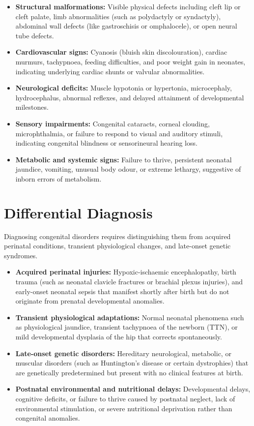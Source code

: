 \begin{itemize}
    \item \textbf{Structural malformations:} Visible physical defects including cleft lip or cleft palate, limb abnormalities (such as polydactyly or syndactyly), abdominal wall defects (like gastroschisis or omphalocele), or open neural tube defects.
    \item \textbf{Cardiovascular signs:} Cyanosis (bluish skin discolouration), cardiac murmurs, tachypnoea, feeding difficulties, and poor weight gain in neonates, indicating underlying cardiac shunts or valvular abnormalities.
    \item \textbf{Neurological deficits:} Muscle hypotonia or hypertonia, microcephaly, hydrocephalus, abnormal reflexes, and delayed attainment of developmental milestones.
    \item \textbf{Sensory impairments:} Congenital cataracts, corneal clouding, microphthalmia, or failure to respond to visual and auditory stimuli, indicating congenital blindness or sensorineural hearing loss.
    \item \textbf{Metabolic and systemic signs:} Failure to thrive, persistent neonatal jaundice, vomiting, unusual body odour, or extreme lethargy, suggestive of inborn errors of metabolism.
\end{itemize}

\section*{Differential Diagnosis}
Diagnosing congenital disorders requires distinguishing them from acquired perinatal conditions, transient physiological changes, and late-onset genetic syndromes.

\begin{itemize}
    \item \textbf{Acquired perinatal injuries:} Hypoxic-ischaemic encephalopathy, birth trauma (such as neonatal clavicle fractures or brachial plexus injuries), and early-onset neonatal sepsis that manifest shortly after birth but do not originate from prenatal developmental anomalies.
    \item \textbf{Transient physiological adaptations:} Normal neonatal phenomena such as physiological jaundice, transient tachypnoea of the newborn (TTN), or mild developmental dysplasia of the hip that corrects spontaneously.
    \item \textbf{Late-onset genetic disorders:} Hereditary neurological, metabolic, or muscular disorders (such as Huntington's disease or certain dystrophies) that are genetically predetermined but present with no clinical features at birth.
    \item \textbf{Postnatal environmental and nutritional delays:} Developmental delays, cognitive deficits, or failure to thrive caused by postnatal neglect, lack of environmental stimulation, or severe nutritional deprivation rather than congenital anomalies.
\end{itemize}

